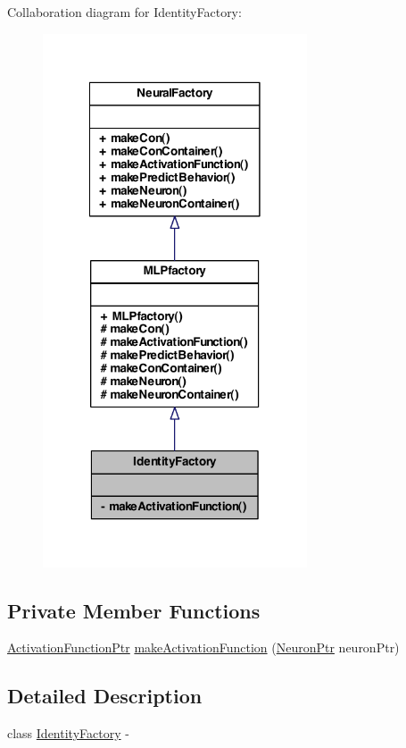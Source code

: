 Collaboration diagram for IdentityFactory:
\nopagebreak
\begin{figure}[H]
\begin{center}
\leavevmode
\includegraphics[width=222pt]{class_identity_factory__coll__graph}
\end{center}
\end{figure}
\subsection*{Private Member Functions}
\begin{DoxyCompactItemize}
\item 
\hyperlink{_a_m_o_r_e_8h_a77602a0277a02e5769c3df0adc669b17}{ActivationFunctionPtr} \hyperlink{class_identity_factory_a13a9bb3996539b46c4d9eee7c2024ea1}{makeActivationFunction} (\hyperlink{_a_m_o_r_e_8h_ac1ea936c2c7728eb382278131652fef4}{NeuronPtr} neuronPtr)
\end{DoxyCompactItemize}


\subsection{Detailed Description}
class \hyperlink{class_identity_factory}{IdentityFactory} -\/ 

